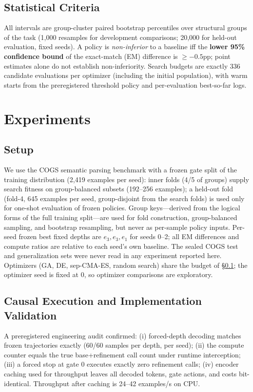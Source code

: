 \documentclass[11pt]{article}
\begin{document}
\subsection{Statistical Criteria}
\label{sec:stats}
All intervals are group-cluster paired bootstrap percentiles \citep{cameron2015practitioner} over structural groups of the task (1{,}000 resamples for development comparisons; 20{,}000 for held-out evaluation, fixed seeds). A policy is \emph{non-inferior} to a baseline iff the \textbf{lower 95\% confidence bound} of the exact-match (EM) difference is $\geq -0.5$pp; point estimates alone do not establish non-inferiority. Search budgets are exactly 336 candidate evaluations per optimizer (including the initial population), with warm starts from the preregistered threshold policy and per-evaluation best-so-far logs.

\section{Experiments}
\label{sec:experiments}

\subsection{Setup}
\label{sec:setup}
We use the COGS semantic parsing benchmark \citep{kim2020cogs} with a frozen gate split of the training distribution (2{,}419 examples per seed): inner folds (4/5 of groups) supply search fitness on group-balanced subsets (192--256 examples); a held-out fold (fold-4, 645 examples per seed, group-disjoint from the search folds) is used only for one-shot evaluation of frozen policies. Group keys---derived from the logical forms of the full training split---are used for fold construction, group-balanced sampling, and bootstrap resampling, but never as per-sample policy inputs. Per-seed frozen best fixed depths are $e_3, e_3, e_1$ for seeds 0--2; all EM differences and compute ratios are relative to each seed's own baseline. The sealed COGS test and generalization sets were never read in any experiment reported here. Optimizers (GA, DE, sep-CMA-ES, random search) share the budget of \S\ref{sec:stats}; the optimizer seed is fixed at 0, so optimizer comparisons are exploratory.

\subsection{Causal Execution and Implementation Validation}
A preregistered engineering audit confirmed: (i) forced-depth decoding matches frozen trajectories exactly (60/60 samples per depth, per seed); (ii) the compute counter equals the true base+refinement call count under runtime interception; (iii) a forced stop at gate 0 executes exactly zero refinement calls; (iv) encoder caching used for throughput leaves all decoded tokens, gate actions, and costs bit-identical. Throughput after caching is 24--42 examples/s on CPU.
\end{document}
